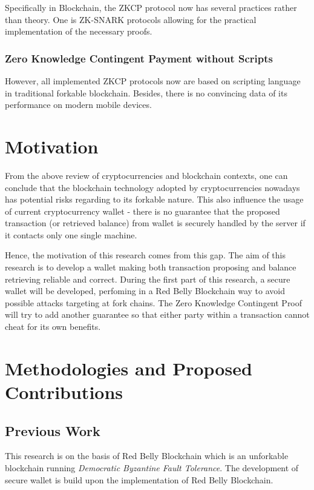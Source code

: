 \documentclass[12pt]{article}
\begin{document}
Specifically in Blockchain, the ZKCP protocol now has several practices rather than theory. One is ZK-SNARK protocols allowing for the practical implementation of the necessary proofs\cite{kalai2006succinct}\cite{ben2015secure}\cite{ecc2011}.

\subsubsection{Zero Knowledge Contingent Payment without Scripts}

However, all implemented ZKCP protocols now are based on scripting language in traditional forkable blockchain\cite{Banasik2016}. Besides, there is no convincing data of its performance on modern mobile devices\cite{doi:10.1080/00207160.2014.933816}.

\section{Motivation}

From the above review of cryptocurrencies and blockchain contexts, one can conclude that the blockchain technology adopted by cryptocurrencies nowadays has potential risks regarding to its forkable nature. This also influence the usage of current cryptocurrency wallet - there is no guarantee that the proposed transaction (or retrieved balance) from wallet is securely handled by the server if it contacts only one single machine.

Hence, the motivation of this research comes from this gap. The aim of this research is to develop a wallet making both transaction proposing and balance retrieving reliable and correct. During the first part of this research, a secure wallet will be developed, perfoming in a Red Belly Blockchain way to avoid possible attacks targeting at fork chains. The Zero Knowledge Contingent Proof will try to add another guarantee so that either party within a transaction cannot cheat for its own benefits.

\section{Methodologies and Proposed Contributions}

\subsection{Previous Work}

This research is on the basis of Red Belly Blockchain which is an unforkable blockchain running \textit{Democratic Byzantine Fault Tolerance}. The development of secure wallet is build upon the implementation of Red Belly Blockchain.
\end{document}
